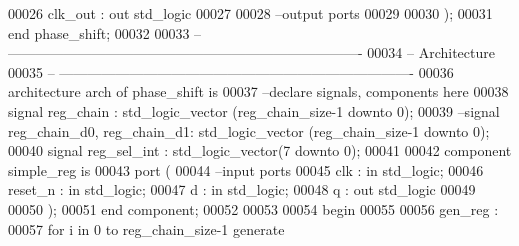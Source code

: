 \begin{DoxyCode}
00026           \textcolor{vhdlchar}{clk_out}   \textcolor{vhdlchar}{:} \textcolor{keywordflow}{out} \textcolor{comment}{std\_logic}
00027 
00028 \textcolor{keyword}{        --output ports }
00029         
00030         \textcolor{vhdlchar}{)};
00031 \textcolor{keywordflow}{end} \textcolor{vhdlchar}{phase\_shift};
00032 
00033 \textcolor{keyword}{-- ----------------------------------------------------------------------------}
00034 \textcolor{keyword}{-- Architecture}
00035 \textcolor{keyword}{-- ----------------------------------------------------------------------------}
00036 \textcolor{keywordflow}{architecture} arch \textcolor{keywordflow}{of} phase_shift is
00037 \textcolor{keyword}{--declare signals,  components here}
00038 \textcolor{keywordflow}{signal} \textcolor{vhdlchar}{reg_chain} \textcolor{vhdlchar}{:} \textcolor{comment}{std\_logic\_vector} \textcolor{vhdlchar}{(}\textcolor{vhdlchar}{reg_chain_size}\textcolor{vhdlchar}{-}\textcolor{vhdllogic}{}\textcolor{vhdllogic}{1} \textcolor{keywordflow}{downto} \textcolor{vhdllogic}{}\textcolor{vhdllogic}{0}\textcolor{vhdlchar}{)};
00039 \textcolor{keyword}{--signal reg\_chain\_d0,  reg\_chain\_d1: std\_logic\_vector (reg\_chain\_size-1 downto 0);}
00040 \textcolor{keywordflow}{signal} \textcolor{vhdlchar}{reg_sel_int} \textcolor{vhdlchar}{:} \textcolor{comment}{std\_logic\_vector}\textcolor{vhdlchar}{(}\textcolor{vhdllogic}{}\textcolor{vhdllogic}{7} \textcolor{keywordflow}{downto} \textcolor{vhdllogic}{}\textcolor{vhdllogic}{0}\textcolor{vhdlchar}{)};
00041 
00042 \textcolor{keywordflow}{component} simple_reg \textcolor{keywordflow}{is}
00043   \textcolor{keywordflow}{port} (
00044 \textcolor{keyword}{        --input ports }
00045             clk      : \textcolor{keywordflow}{in} \textcolor{comment}{std\_logic};
00046             reset_n  : \textcolor{keywordflow}{in} \textcolor{comment}{std\_logic};
00047             d           : \textcolor{keywordflow}{in} \textcolor{comment}{std\_logic};
00048             q           : \textcolor{keywordflow}{out} \textcolor{comment}{std\_logic}
00049         
00050         );
00051 \textcolor{keywordflow}{end} \textcolor{keywordflow}{component}; 
00052 
00053   
00054 \textcolor{vhdlkeyword}{begin}
00055 
00056 \textcolor{vhdlchar}{gen\_reg} \textcolor{vhdlchar}{:}
00057     \textcolor{keywordflow}{for} \textcolor{vhdlchar}{i} \textcolor{keywordflow}{in} \textcolor{vhdllogic}{}\textcolor{vhdllogic}{0} \textcolor{keywordflow}{to} \textcolor{vhdlchar}{reg_chain_size}\textcolor{vhdlchar}{-}\textcolor{vhdllogic}{}\textcolor{vhdllogic}{1} \textcolor{keywordflow}{generate}

\end{DoxyCode}
